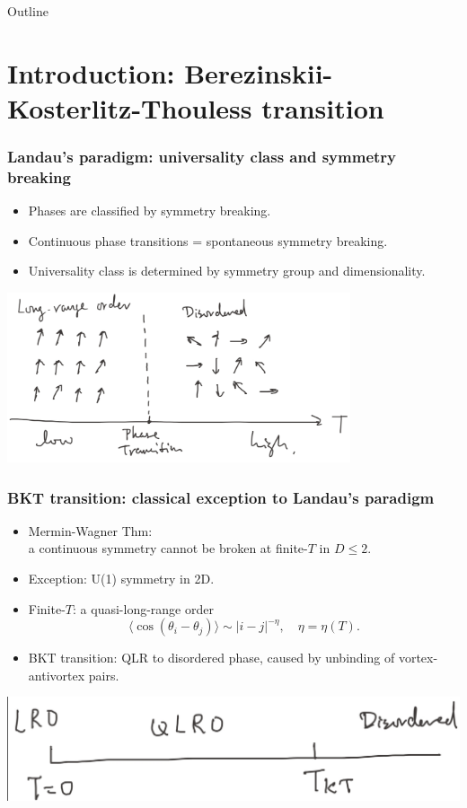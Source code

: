 \documentclass[xcolor=table, aspectratio=1610,ignorenonframetext]{beamer}
\begin{document}
\begin{frame}{Outline}
		\tableofcontents
\end{frame}

\section{Introduction: Berezinskii-Kosterlitz-Thouless transition}

\begin{frame}
  \frametitle{Landau's paradigm: universality class and symmetry breaking}
  \begin{itemize}
  \item Phases are classified by symmetry breaking.
  \item Continuous phase transitions = spontaneous symmetry breaking.
  \item Universality class is determined by symmetry group and dimensionality.
  \end{itemize}
  \begin{center}
    \includegraphics[height=5cm]{landau-paradigm}
  \end{center}
\end{frame}

\begin{frame}
  \frametitle{BKT transition: classical exception to Landau's paradigm}
  \begin{itemize}
  \item Mermin-Wagner Thm:\\a continuous symmetry cannot be broken at finite-$T$ in $D\leq2$.
  \item Exception: U(1) symmetry in 2D.
  \item Finite-$T$: a quasi-long-range order
    \[\langle \cos(\theta_i-\theta_j)\rangle\sim |i-j|^{-\eta},\quad \eta=\eta(T).\]
  \item BKT transition: QLR to disordered phase, caused by unbinding of vortex-antivortex pairs.
  \end{itemize}
  \begin{center}
    \includegraphics[width=.6\textwidth]{kt-pd}
  \end{center}
\end{frame}
\end{document}
